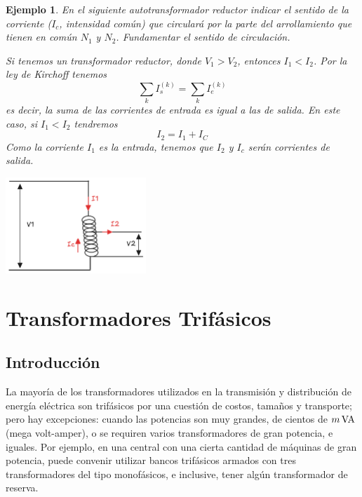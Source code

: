 \documentclass[11pt]{report}
\newtheorem{example}{Ejemplo}[section]
\begin{document}
    \begin{example}
        En el siguiente autotransformador reductor indicar el sentido de la corriente ($I_c$, intensidad común) que circulará por la parte del arrollamiento que tienen en común $N_1$ y $N_2$. Fundamentar el sentido de circulación.

        Si tenemos un transformador reductor, donde $V_1 > V_2$, entonces $I_1 < I_2$. Por la ley de Kirchoff tenemos 
        \begin{equation}
            \sum_k I_s^{(k)} = \sum_k I_e^{(k)}
        \end{equation}
        es decir, la suma de las corrientes de entrada es igual a las de salida. En este caso, si $I_1 < I_2$ tendremos 
        \begin{equation}
            I_2 = I_1 + I_C
        \end{equation}
        Como la corriente $I_1$ es la entrada, tenemos que $I_2$ y $I_c$ serán corrientes de salida.
        \begin{center}
            \includegraphics[width=200px]{ejemplo2.png}
        \end{center}
    \end{example}



\chapter{Transformadores Trifásicos}

\section{Introducción}
La mayoría de los transformadores utilizados en la transmisión y distribución de energía eléctrica
son trifásicos por una cuestión de costos, tamaños y transporte; pero hay excepciones: cuando las 
potencias son muy grandes, de cientos de $m\,{\textnormal{VA}}$ (mega volt-amper), o se requiren varios transformadores
de gran potencia, e iguales. Por ejemplo, en una central con una cierta cantidad de máquinas de gran potencia,
puede convenir utilizar bancos trifásicos armados con tres transformadores del tipo monofásicos, e inclusive,
tener algún transformador de reserva.
\end{document}
